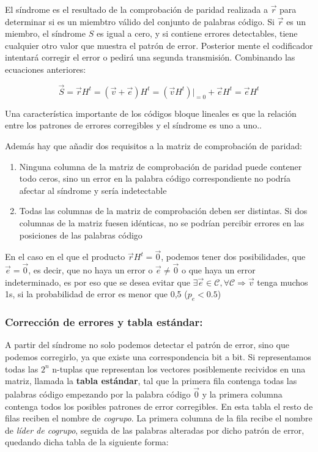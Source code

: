 \documentclass{article}
\begin{document}
El síndrome es el resultado de la comprobación de paridad realizada a $\vec{r}$ para determinar si es un miembtro válido del conjunto de palabras código. Si $\vec{r}$ es un miembro, el síndrome $S$ es igual a cero, y si contiene errores detectables, tiene cualquier otro valor que muestra el patrón de error. Posterior mente el codificador intentará corregir el error o pedirá una segunda transmisión. Combinando las ecuaciones anteriores:

\begin{equation}
    \vec{S} = \vec{r} H^t = (\vec{v} + \vec{e}) H^t = (\vec{v} H^t)|_{= 0} + \vec{e}H^t = \vec{e}H^t
\end{equation}

Una característica importante de los códigos bloque lineales es que la relación entre los patrones de errores corregibles y el síndrome es uno a uno..

Además hay que añadir dos requisitos a la matriz de comprobación de paridad:

\begin{enumerate}
    \item Ninguna columna de la matriz de comprobación de paridad puede contener todo ceros, sino un error en la palabra código correspondiente no podría afectar al síndrome y sería indetectable
    \item Todas las columnas de la matriz de comprobación deben ser distintas. Si dos columnas de la matriz fuesen idénticas, no se podrían percibir errores en las posiciones de las palabras código
\end{enumerate}

En el caso en el que el producto $\vec{r}H^t = \vec{0}$, podemos tener dos posibilidades, que $\vec{e} = \vec{0}$, es decir, que no haya un error o $\vec{e} \neq \vec{0}$ o que haya un error indeterminado, es por eso que se desea evitar que $\exists \vec{e} \in \mathcal{C}, \forall \mathcal{C} \Rightarrow \vec{v}$ tenga muchos 1s, si la probabilidad de error es menor que 0,5 ($p_e < 0.5$)

\pagebreak

\subsubsection{Corrección de errores y tabla estándar:} 

A partir del síndrome no solo podemos detectar el patrón de error, sino que podemos corregirlo, ya que existe una correspondencia bit a bit. Si representamos todas las $2^n$ n-tuplas que representan los vectores posiblemente recividos en una matriz, llamada la \textbf{tabla estándar}, tal que la primera fila contenga todas las palabras código empezando por la palabra código $\vec{0}$ y la primera columna contenga todos los posibles patrones de error corregibles. En esta tabla el resto de filas reciben el nombre de \textit{cogrupo}. La primera columna de la fila recibe el nombre de \textit{líder de cogrupo}, seguida de las palabras alteradas por dicho patrón de error, quedando dicha tabla de la siguiente forma:
\end{document}
